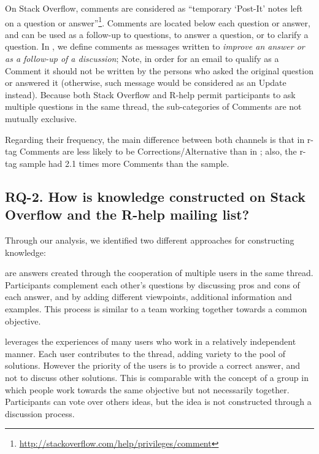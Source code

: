 On Stack Overflow, comments are considered as ``temporary `Post-It' notes left on a question or answer''\footnote{\url{http://stackoverflow.com/help/privileges/comment}}. Comments are located below each question or answer, and can be used as a follow-up to questions, to answer a question, or to clarify a question. In \RH, we define comments as messages written to \emph{improve an answer or as a follow-up of a discussion}; Note, in order for an email to qualify as a Comment it should not be written by the persons who asked the original question or answered it (otherwise, such message would be considered as an Update instead).
Because both Stack Overflow and R-help permit participants to ask multiple questions in the same thread, the sub-categories of Comments are not mutually exclusive.  

Regarding their frequency, the main difference between both channels is that in \SO r-tag Comments are less likely to be Corrections/Alternative than in \RH; also, the \SO r-tag sample had 2.1 times more Comments than the \RH sample.

\subsection{RQ-2. How is knowledge constructed on Stack Overflow and the R-help mailing list?}
\label{sec:rq2}

    Through our analysis, we identified two different approaches for constructing knowledge:

\begin{description}[itemsep=2pt, topsep=0pt, leftmargin=1em, parsep=0pt]
\item[Participatory knowledge construction] are answers created through the cooperation of multiple
  users in the same thread.  Participants complement each other's questions by discussing pros and
  cons of each answer, and by adding different viewpoints, additional information and examples.
  This process is similar to a team working together towards
  a common objective.

\item[Crowd knowledge construction] leverages the experiences of many users who work in a relatively
  independent manner. Each user contributes to the thread, adding variety to the
  pool of solutions. However the priority of the users is to provide a correct answer, and not to discuss other solutions.
  This is comparable with the concept of a group in which people work towards the
  same objective but not necessarily together.  Participants can vote over others ideas, but the
  idea is not constructed through a discussion process.
\end{description}

